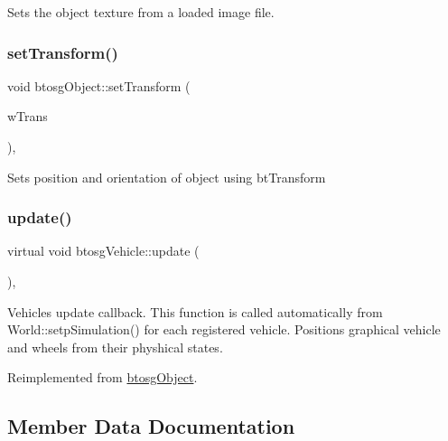 Sets the object texture from a loaded image file. \mbox{\label{classbtosgObject_ad33fcab26c0c83ccab6dca6906e8cdb0}} 
\subsubsection{\texorpdfstring{setTransform()}{setTransform()}}
{\footnotesize\ttfamily void btosg\+Object\+::set\+Transform (\begin{DoxyParamCaption}\item[{const bt\+Transform \&}]{w\+Trans }\end{DoxyParamCaption})\hspace{0.3cm}{\ttfamily [inline]}, {\ttfamily [inherited]}}

Sets position and orientation of object using bt\+Transform \mbox{\label{classbtosgVehicle_a5fd0f471df492ac232c9b772a28bd2b9}} 
\subsubsection{\texorpdfstring{update()}{update()}}
{\footnotesize\ttfamily virtual void btosg\+Vehicle\+::update (\begin{DoxyParamCaption}{ }\end{DoxyParamCaption})\hspace{0.3cm}{\ttfamily [inline]}, {\ttfamily [virtual]}}

Vehicle\textquotesingle{}s update callback. This function is called automatically from World\+::setp\+Simulation() for each registered vehicle. Positions graphical vehicle and wheels from their physhical states. 

Reimplemented from \mbox{\hyperlink{classbtosgObject_a342917817dfde62554f83da8e0d5110b}{btosg\+Object}}.



\subsection{Member Data Documentation}
\mbox{\label{classbtosgObject_a64ccde0543c184ed1749fdb9c9699785}} 
